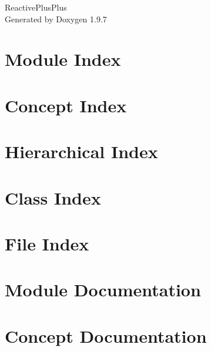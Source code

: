\documentclass[twoside]{book}
\newcommand{\+}{\discretionary{\mbox{\scriptsize$\hookleftarrow$}}{}{}}
\newcommand{\clearemptydoublepage}{%
    \newpage{\pagestyle{empty}\cleardoublepage}%
  }
\begin{document}
  \raggedbottom
    \hypersetup{pageanchor=false,
                bookmarksnumbered=true,
                pdfencoding=unicode
               }
  \begin{titlepage}
  \vspace*{7cm}
  \begin{center}%
  {\Large Reactive\+Plus\+Plus}\\
  \vspace*{1cm}
  {\large Generated by Doxygen 1.9.7}\\
  \end{center}
  \end{titlepage}
  \clearemptydoublepage
  \tableofcontents
  \clearemptydoublepage
  \hypersetup{pageanchor=true}

\chapter{Module Index}

\chapter{Concept Index}

\chapter{Hierarchical Index}

\chapter{Class Index}

\chapter{File Index}

\chapter{Module Documentation}

\chapter{Concept Documentation}

















\end{document}
